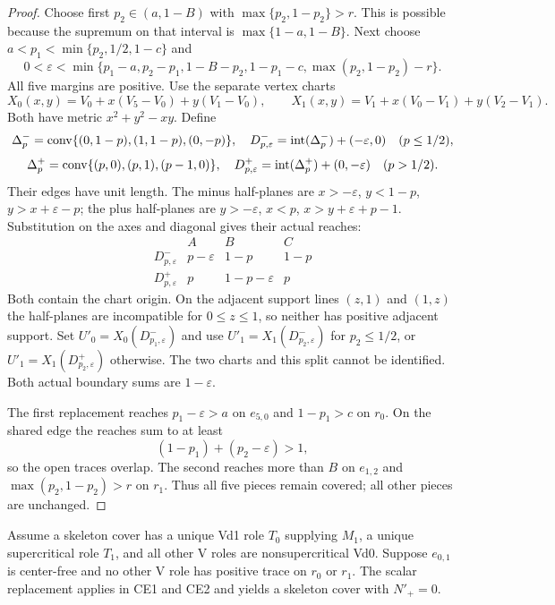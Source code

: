 \begin{proof}
Choose first $p_2\in(a,1-B)$ with $\max\{p_2,1-p_2\}>r$. This is
possible because the supremum on that interval is $\max\{1-a,1-B\}$.
Next choose $a<p_1<\min\{p_2,1/2,1-c\}$ and
\[
 0<\varepsilon<\min\{p_1-a,p_2-p_1,1-B-p_2,
                         1-p_1-c,\max(p_2,1-p_2)-r\}.
\]
All five margins are positive. Use the separate vertex charts
\[
 X_0(x,y)=V_0+x(V_5-V_0)+y(V_1-V_0),\qquad
 X_1(x,y)=V_1+x(V_0-V_1)+y(V_2-V_1).
\]
Both have metric $x^2+y^2-xy$. Define
\[
 \Delta_p^-=\mathrm{conv}\{(0,1-p),(1,1-p),(0,-p)\},\quad
 D^-_{p,\varepsilon}=\mathrm{int}(\Delta_p^-)+(-\varepsilon,0)
 \quad(p\le1/2),
\]
\[
 \Delta_p^+=\mathrm{conv}\{(p,0),(p,1),(p-1,0)\},\quad
 D^+_{p,\varepsilon}=\mathrm{int}(\Delta_p^+)+(0,-\varepsilon)
 \quad(p>1/2).
\]
Their edges have unit length. The minus half-planes are
$x>-\varepsilon$, $y<1-p$, $y>x+\varepsilon-p$; the plus half-planes
are $y>-\varepsilon$, $x<p$, $x>y+\varepsilon+p-1$.
Substitution on the axes and diagonal gives their actual reaches:
\[
\begin{array}{c|ccc}
 &A&B&C\\\hline
 D^-_{p,\varepsilon}&p-\varepsilon&1-p&1-p\\
 D^+_{p,\varepsilon}&p&1-p-\varepsilon&p
\end{array}
\]
Both contain the chart origin. On the adjacent support lines $(z,1)$ and
$(1,z)$ the half-planes are incompatible for $0\le z\le1$, so neither
has positive adjacent support.
Set $U'_0=X_0(D^-_{p_1,\varepsilon})$ and use
$U'_1=X_1(D^-_{p_2,\varepsilon})$ for $p_2\le1/2$, or
$U'_1=X_1(D^+_{p_2,\varepsilon})$ otherwise. The two charts and this
split cannot be identified. Both actual boundary sums are $1-\varepsilon$.

The first replacement reaches $p_1-\varepsilon>a$ on $e_{5,0}$ and
$1-p_1>c$ on $r_0$. On the shared edge the reaches sum to at least
\[
 (1-p_1)+(p_2-\varepsilon)>1,
\]
so the open traces overlap. The second reaches more than $B$ on
$e_{1,2}$ and $\max(p_2,1-p_2)>r$ on $r_1$. Thus all five pieces
remain covered; all other pieces are unchanged.
\end{proof}

\begin{proposition}
\label{prop:appendix-vd1-two-chart-replacement}
Assume a skeleton cover has a unique Vd1 role $T_0$ supplying $M_1$, a
unique supercritical role $T_1$, and all other V roles are nonsupercritical
Vd0. Suppose $e_{0,1}$ is center-free and no other V role has positive
trace on $r_0$ or $r_1$. The scalar replacement applies in CE1 and CE2
and yields a skeleton cover with $N'_+=0$.
\end{proposition}

